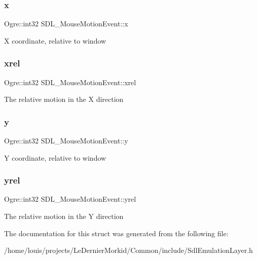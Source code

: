 \subsubsection{\texorpdfstring{x}{x}}
{\footnotesize\ttfamily Ogre\+::int32 S\+D\+L\+\_\+\+Mouse\+Motion\+Event\+::x}

X coordinate, relative to window \mbox{\label{struct_s_d_l___mouse_motion_event_a09f6ff4e8be12239421d5d2d279cb5f1}} 
\subsubsection{\texorpdfstring{xrel}{xrel}}
{\footnotesize\ttfamily Ogre\+::int32 S\+D\+L\+\_\+\+Mouse\+Motion\+Event\+::xrel}

The relative motion in the X direction \mbox{\label{struct_s_d_l___mouse_motion_event_a5ec63d6686b27a2feb8f95073e4a4ad2}} 
\subsubsection{\texorpdfstring{y}{y}}
{\footnotesize\ttfamily Ogre\+::int32 S\+D\+L\+\_\+\+Mouse\+Motion\+Event\+::y}

Y coordinate, relative to window \mbox{\label{struct_s_d_l___mouse_motion_event_a3e0fa5c6ad5bf75518caff81f984aed3}} 
\subsubsection{\texorpdfstring{yrel}{yrel}}
{\footnotesize\ttfamily Ogre\+::int32 S\+D\+L\+\_\+\+Mouse\+Motion\+Event\+::yrel}

The relative motion in the Y direction 

The documentation for this struct was generated from the following file\+:\begin{DoxyCompactItemize}
\item 
/home/louis/projects/\+Le\+Dernier\+Morkid/\+Common/include/Sdl\+Emulation\+Layer.\+h\end{DoxyCompactItemize}
